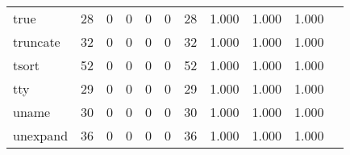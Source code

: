 \begin{longtable}{lp{1.20cm}p{1.20cm}p{1.20cm}p{1.20cm}p{1.20cm}p{1.20cm}p{1.20cm}p{1.20cm}p{1.20cm}p{1.20cm}}
true      &                                    28 &                                                  0 &                                                  0 &                                                  0 &                                                  0 &                                                 28 &                                         1.000 &                                              1.000 &                                              1.000 \\
truncate  &                                    32 &                                                  0 &                                                  0 &                                                  0 &                                                  0 &                                                 32 &                                         1.000 &                                              1.000 &                                              1.000 \\
tsort     &                                    52 &                                                  0 &                                                  0 &                                                  0 &                                                  0 &                                                 52 &                                         1.000 &                                              1.000 &                                              1.000 \\
tty       &                                    29 &                                                  0 &                                                  0 &                                                  0 &                                                  0 &                                                 29 &                                         1.000 &                                              1.000 &                                              1.000 \\
uname     &                                    30 &                                                  0 &                                                  0 &                                                  0 &                                                  0 &                                                 30 &                                         1.000 &                                              1.000 &                                              1.000 \\
unexpand  &                                    36 &                                                  0 &                                                  0 &                                                  0 &                                                  0 &                                                 36 &                                         1.000 &                                              1.000 &                                              1.000 \\

\end{longtable}
